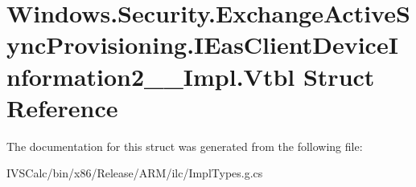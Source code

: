\hypertarget{struct_windows_1_1_security_1_1_exchange_active_sync_provisioning_1_1_i_eas_client_device_information2_____impl_1_1_vtbl}{}\section{Windows.\+Security.\+Exchange\+Active\+Sync\+Provisioning.\+I\+Eas\+Client\+Device\+Information2\+\_\+\+\_\+\+Impl.\+Vtbl Struct Reference}
\label{struct_windows_1_1_security_1_1_exchange_active_sync_provisioning_1_1_i_eas_client_device_information2_____impl_1_1_vtbl}


The documentation for this struct was generated from the following file\+:\begin{DoxyCompactItemize}
\item 
I\+V\+S\+Calc/bin/x86/\+Release/\+A\+R\+M/ilc/Impl\+Types.\+g.\+cs\end{DoxyCompactItemize}
